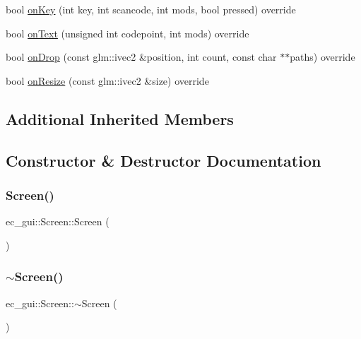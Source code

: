 \begin{DoxyCompactItemize}
\item 
bool \mbox{\hyperlink{classec__gui_1_1_screen_a3eda49d97cc53349466a96d9549520f8}{on\+Key}} (int key, int scancode, int mods, bool pressed) override
\item 
bool \mbox{\hyperlink{classec__gui_1_1_screen_a1becce24696b898cf30cd69815905f82}{on\+Text}} (unsigned int codepoint, int mods) override
\item 
bool \mbox{\hyperlink{classec__gui_1_1_screen_a5554d10648c66060b5eb96c5ff918b58}{on\+Drop}} (const glm\+::ivec2 \&position, int count, const char $\ast$$\ast$paths) override
\item 
bool \mbox{\hyperlink{classec__gui_1_1_screen_a5aae70a6f4fab5d4242d32fe2ce29889}{on\+Resize}} (const glm\+::ivec2 \&size) override
\end{DoxyCompactItemize}
\subsection*{Additional Inherited Members}


\subsection{Constructor \& Destructor Documentation}
\mbox{\label{classec__gui_1_1_screen_a70d376c7107983dc3e57f70c2eef3ffa}} 
\subsubsection{\texorpdfstring{Screen()}{Screen()}}
{\footnotesize\ttfamily ec\+\_\+gui\+::\+Screen\+::\+Screen (\begin{DoxyParamCaption}{ }\end{DoxyParamCaption})\hspace{0.3cm}{\ttfamily [explicit]}}

\mbox{\label{classec__gui_1_1_screen_ae31ba095c31a7811bb18b0049511565c}} 
\subsubsection{\texorpdfstring{$\sim$\+Screen()}{~Screen()}}
{\footnotesize\ttfamily ec\+\_\+gui\+::\+Screen\+::$\sim$\+Screen (\begin{DoxyParamCaption}{ }\end{DoxyParamCaption})\hspace{0.3cm}{\ttfamily [default]}}



